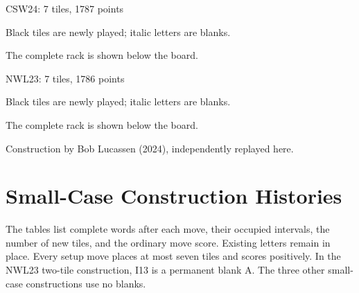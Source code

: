 \documentclass{article}
\begin{document}
\clearpage
\begin{center}
\large CSW24: 7 tiles, 1787 points\par\medskip

\par\medskip\normalsize Black tiles are newly played; italic letters are blanks.\par The complete rack is shown below the board.
\end{center}
\clearpage
\begin{center}
\large NWL23: 7 tiles, 1786 points\par\medskip

\par\medskip\normalsize Black tiles are newly played; italic letters are blanks.\par The complete rack is shown below the board.
\par Construction by Bob Lucassen (2024), independently replayed here.
\end{center}
\clearpage
\section*{Small-Case Construction Histories}
The tables list complete words after each move, their occupied intervals, the number of new tiles, and the ordinary move score. Existing letters remain in place. Every setup move places at most seven tiles and scores positively. In the NWL23 two-tile construction, I13 is a permanent blank A. The three other small-case constructions use no blanks.

\end{document}
